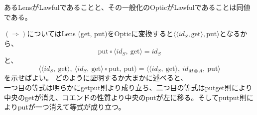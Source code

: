 \documentclass[uplatex,dvipdfmx]{beamer}
\newcommand{\tuple}[1]{\langle #1\rangle}
\begin{document}
  \begin{frame}
    \begin{theorem}
      あるLensがLawfulであることと、その一般化のOpticがLawfulであることは同値である。
    \end{theorem}
    $(\Longrightarrow)$についてはLens (get, put)をOpticに変換すると$\tuple{\tuple{id_S, \mathrm{get}}, \mathrm{put}}$となるから、\[\mathrm{put} \circ\tuple{id_S,\ \mathrm{get}} = id_S\]と、
    \[\tuple{\tuple{id_S,\ \mathrm{get}},\ \tuple{id_S,\ \mathrm{get}}\circ\mathrm{put},\ \mathrm{put}}=\tuple{\tuple{id_S,\ \mathrm{get}},\  id_{M\otimes A},\ \mathrm{put}}\]を示せばよい。
    どのように証明するか大まかに述べると、\\
    一つ目の等式は明らかにgetput則より成り立ち、二つ目の等式はputget則により中央のgetが消え、コエンドの性質より中央のputが左に移る。そしてputput則によりputが一つ消えて等式が成り立つ。
  \end{frame}
\end{document}

